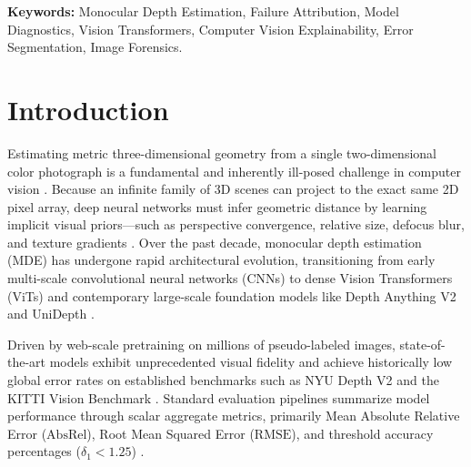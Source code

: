 \documentclass[11pt,a4paper]{article}
\begin{document}
\textbf{\small Keywords:} Monocular Depth Estimation, Failure Attribution, Model Diagnostics, Vision Transformers, Computer Vision Explainability, Error Segmentation, Image Forensics.

\newpage

\section{Introduction}
\label{sec:intro}

Estimating metric three-dimensional geometry from a single two-dimensional color photograph is a fundamental and inherently ill-posed challenge in computer vision \citep{rajapaksha2024deep,ming2020deep}. Because an infinite family of 3D scenes can project to the exact same 2D pixel array, deep neural networks must infer geometric distance by learning implicit visual priors—such as perspective convergence, relative size, defocus blur, and texture gradients \citep{eigen2014depth,bhat2021adabins}. Over the past decade, monocular depth estimation (MDE) has undergone rapid architectural evolution, transitioning from early multi-scale convolutional neural networks (CNNs) \citep{eigen2014depth,laina2016deeper} to dense Vision Transformers (ViTs) \citep{ranftl2021vision,bhat2023zoedepth} and contemporary large-scale foundation models like Depth Anything V2 \citep{yang2024depthanythingv2} and UniDepth \citep{piccinelli2024unidepth}.

Driven by web-scale pretraining on millions of pseudo-labeled images, state-of-the-art models exhibit unprecedented visual fidelity and achieve historically low global error rates on established benchmarks such as NYU Depth V2 \citep{silberman2012indoor} and the KITTI Vision Benchmark \citep{geiger2013vision}. Standard evaluation pipelines summarize model performance through scalar aggregate metrics, primarily Mean Absolute Relative Error ($\text{AbsRel}$), Root Mean Squared Error ($\text{RMSE}$), and threshold accuracy percentages ($\delta_1 < 1.25$) \citep{rajapaksha2024deep,spencer2022monocular}.
\end{document}
